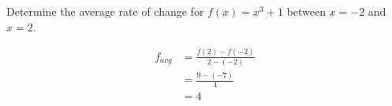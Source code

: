 \documentclass[fleqn,addpoints]{exam}
\begin{document}
\begin{questions}

  \ifprintanswers
  \else
    \pagebreak
  \fi

  \question[5]
    Determine the average rate of change for $f(x) = x^3 + 1$ between $x = -2$ and $x = 2$.
    \begin{solution}[5 cm]
      \begin{align*}
        f_{avg} &= \frac{f(2) - f(-2)}{2 - (-2)} \\
                &= \frac{9 - (-7)}{4} \\
                &= 4 \\
      \end{align*}
    \end{solution}


\end{questions}
\end{document}
